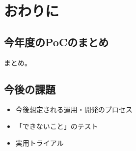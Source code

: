 
\chapter{おわりに}

\section{今年度のPoCのまとめ}

まとめ。

\section{今後の課題}

\begin{itemize}
 \item 今後想定される運用・開発のプロセス
 \item 「できないこと」のテスト
 \item 実用トライアル
\end{itemize}

